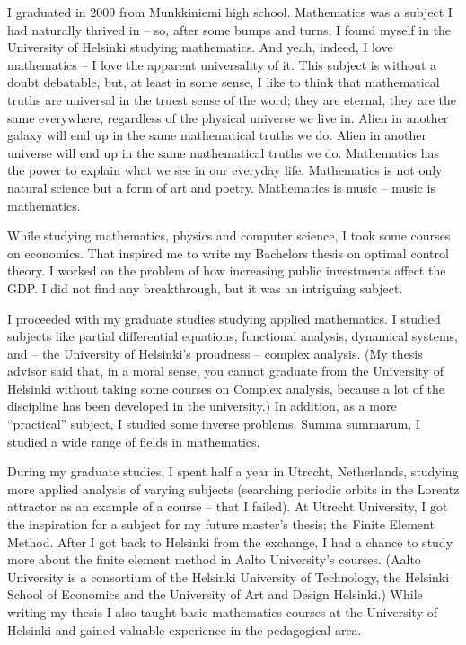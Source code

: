 \documentclass{article}
\begin{document}
                \parbox{\textwidth} {
        I graduated in 2009 from Munkkiniemi high school. Mathematics was a subject I had naturally thrived in – so, after some bumps and turns,  I found myself in the University of Helsinki studying mathematics. And yeah, indeed, I love mathematics – I love the apparent universality of it. This subject is without a doubt debatable, but, at least in some sense, I like to think that mathematical truths are universal in the truest sense of the word; they are eternal, they are the same everywhere, regardless of the physical universe we live in. Alien in another galaxy will end up in the same mathematical truths we do. Alien in another universe will end up in the same mathematical truths we do. Mathematics has the power to explain what we see in our everyday life. Mathematics is not only natural science but a form of art and poetry. Mathematics is music – music is mathematics.

        While studying mathematics, physics and computer science, I took some courses on economics. That inspired me to write my Bachelors thesis on optimal control theory. I worked on the problem of how increasing public investments affect the GDP. I did not find any breakthrough, but it was an intriguing subject.

        I proceeded with my graduate studies studying applied mathematics. I studied subjects like partial differential equations, functional analysis, dynamical systems, and  – the University of Helsinki's proudness – complex analysis. (My thesis advisor said that, in a moral sense, you cannot graduate from the University of Helsinki without taking some courses on Complex analysis, because a lot of the discipline has been developed in the university.) In addition, as a more ``practical'' subject, I studied some inverse problems. Summa summarum, I studied a wide range of fields in mathematics.

        During my graduate studies, I spent half a year in Utrecht, Netherlands, studying more applied analysis of varying subjects (searching periodic orbits in the Lorentz attractor as an example of a course – that I failed). At Utrecht University, I got the inspiration for a subject for my future master's thesis; the Finite Element Method. After I got back to Helsinki from the exchange, I had a chance to study more about the finite element method in Aalto University's courses. (Aalto University is a consortium of the Helsinki University of Technology, the Helsinki School of Economics and the University of Art and Design Helsinki.) While writing my thesis I also taught basic mathematics courses at the University of Helsinki and gained valuable experience in the pedagogical area.

}
\end{document}
